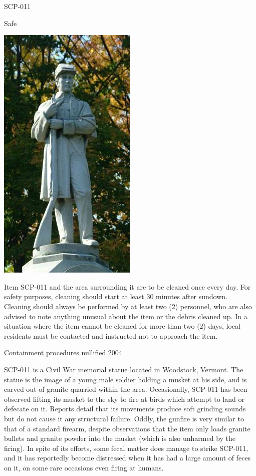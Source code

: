 
 SCP-011

 Safe

\begin{center}
\includegraphics[scale=0.6]{scp/011.jpg}
\end{center}

 Item SCP-011 and the area surrounding it are to be cleaned once every day. For safety purposes, cleaning should start at least 30 minutes after sundown. Cleaning should always be performed by at least two (2) personnel, who are also advised to note anything unusual about the item or the debris cleaned up. In a situation where the item cannot be cleaned for more than two (2) days, local residents must be contacted and instructed not to approach the item.

\lb Containment procedures nullified 2004\rb

 SCP-011 is a Civil War memorial statue located in Woodstock, Vermont. The statue is the image of a young male soldier holding a musket at his side, and is carved out of granite quarried within the area. Occasionally, SCP-011 has been observed lifting its musket to the sky to fire at birds which attempt to land or defecate on it. Reports detail that its movements produce soft grinding sounds but do not cause it any structural failure. Oddly, the gunfire is very similar to that of a standard firearm, despite observations that the item only loads granite bullets and granite powder into the musket (which is also unharmed by the firing). In spite of its efforts, some fecal matter does manage to strike SCP-011, and it has reportedly become distressed when it has had a large amount of feces on it, on some rare occasions even firing at humans.

